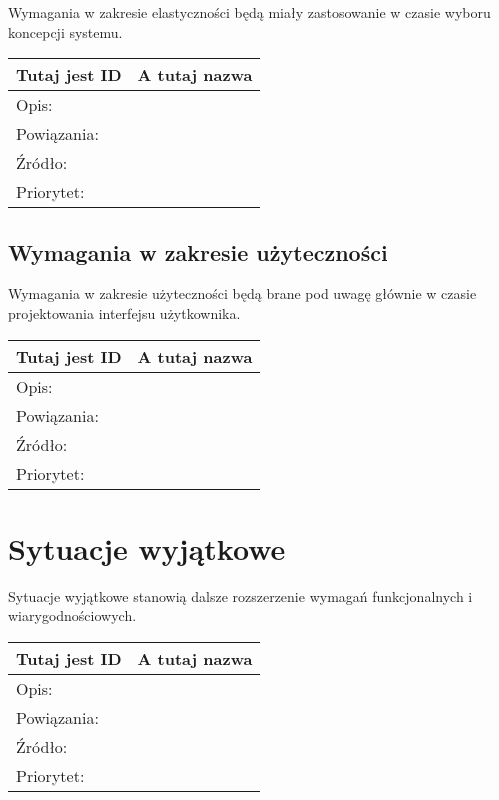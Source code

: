 \documentclass[a4paper,10pt]{article}
\begin{document}
Wymagania w zakresie elastyczności będą miały zastosowanie w czasie wyboru koncepcji systemu.

\begin{center}
\begin{tabular}{|l|l|} \hline

Tutaj jest ID & A tutaj nazwa \\ \hline
Opis: &  \\ \hline
Powiązania: &  \\ \hline
Źródło: &  \\ \hline
Priorytet: &  \\ \hline

\end{tabular}
\end{center}

\subsection{Wymagania w zakresie użyteczności}

Wymagania w zakresie użyteczności będą brane pod uwagę głównie w czasie projektowania interfejsu użytkownika.

\begin{center}
\begin{tabular}{|l|l|} \hline

Tutaj jest ID & A tutaj nazwa \\ \hline
Opis: &  \\ \hline
Powiązania: &  \\ \hline
Źródło: &  \\ \hline
Priorytet: &  \\ \hline

\end{tabular}
\end{center}

\section{Sytuacje wyjątkowe}

Sytuacje wyjątkowe stanowią dalsze rozszerzenie wymagań funkcjonalnych i wiarygodnościowych.

\begin{center}
\begin{tabular}{|l|l|} \hline

Tutaj jest ID & A tutaj nazwa \\ \hline
Opis: &  \\ \hline
Powiązania: &  \\ \hline
Źródło: &  \\ \hline
Priorytet: &  \\ \hline

\end{tabular}
\end{center}
\end{document}
